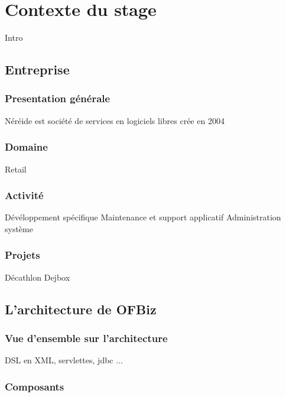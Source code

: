 \chapter{Contexte du stage}

Intro

\section{Entreprise}

\subsection{Presentation générale }
Néréide est société de services en logiciels libres crée en 2004  


























\subsection{Domaine}
Retail
\subsection{Activité}
Dévéloppement spécifique 
Maintenance et support applicatif
Administration système
\subsection{Projets}
Décathlon
Dejbox








\section{L'architecture de OFBiz}
\subsection{Vue d'ensemble sur l'architecture}
DSL en XML, servlettes, jdbc ...
\subsection{Composants }

